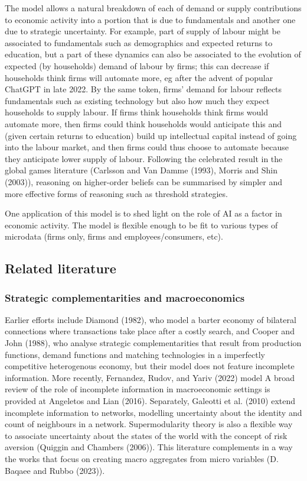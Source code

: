 \documentclass[
]{article}
\theoremstyle{plain}
\theoremstyle{definition}
\theoremstyle{remark}
\begin{document}
The model allows a natural breakdown of each of demand or supply
contributions to economic activity into a portion that is due to
fundamentals and another one due to strategic uncertainty. For example,
part of supply of labour might be associated to fundamentals such as
demographics and expected returns to education, but a part of these
dynamics can also be associated to the evolution of expected (by
households) demand of labour by firms; this can decrease if households
think firms will automate more, eg after the advent of popular ChatGPT
in late 2022. By the same token, firms' demand for labour reflects
fundamentals such as existing technology but also how much they expect
households to supply labour. If firms think households think firms would
automate more, then firms could think households would anticipate this
and (given certain returns to education) build up intellectual capital
instead of going into the labour market, and then firms could thus
choose to automate because they anticipate lower supply of labour.
Following the celebrated result in the global games literature (Carlsson
and Van Damme (1993), Morris and Shin (2003)), reasoning on higher-order
beliefs can be summarised by simpler and more effective forms of
reasoning such as threshold strategies.

One application of this model is to shed light on the role of AI as a
factor in economic activity. The model is flexible enough to be fit to
various types of microdata (firms only, firms and employees/consumers,
etc).

\subsection{Related literature}\label{related-literature}

\subsubsection{Strategic complementarities and
macroeconomics}\label{strategic-complementarities-and-macroeconomics}

Earlier efforts include Diamond (1982), who model a barter economy of
bilateral connections where transactions take place after a costly
search, and Cooper and John (1988), who analyse strategic
complementarities that result from production functions, demand
functions and matching technologies in a imperfectly competitive
heterogenous economy, but their model does not feature incomplete
information. More recently, Fernandez, Rudov, and Yariv (2022) model A
broad review of the role of incomplete information in macroeconomic
settings is provided at Angeletos and Lian (2016). Separately, Galeotti
et al. (2010) extend incomplete information to networks, modelling
uncertainty about the identity and count of neighbours in a network.
Supermodularity theory is also a flexible way to associate uncertainty
about the states of the world with the concept of risk aversion (Quiggin
and Chambers (2006)). This literature complements in a way the works
that focus on creating macro aggregates from micro variables (D. Baqaee
and Rubbo (2023)).
\end{document}
